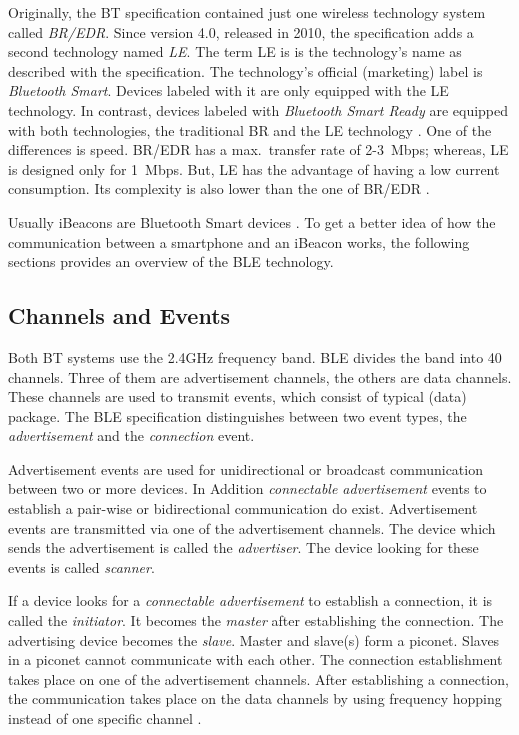 Originally, the \ac{BT} specification contained just one wireless technology system called \emph{\ac{BR}/\ac{EDR}}. Since version 4.0, released in 2010, the specification adds a second technology named \emph{\ac{LE}}. The term \ac{LE} is is the technology's name as described with the specification. The technology's official (marketing) label is \emph{Bluetooth Smart}. Devices labeled with it are only equipped with the \ac{LE} technology. In contrast, devices labeled with \emph{Bluetooth Smart Ready} are equipped with both technologies, the traditional \ac{BR} and the \ac{LE} technology \citep{bluetooth:spec}. One of the differences is speed. \ac{BR}/\ac{EDR} has a max.\ transfer rate of 2-3~Mbps; whereas, \ac{LE} is designed only for 1~Mbps. But, \ac{LE} has the advantage of having a low current consumption. Its complexity is also lower than the one of \ac{BR}/\ac{EDR} \citep{bluetooth:spec}.

Usually iBeacons are Bluetooth Smart devices \citep{binside:ds}. To get a better idea of how the communication between a smartphone and an iBeacon works, the following sections provides an overview of the \ac{BLE} technology.


\subsection*{Channels and Events}
Both \ac{BT} systems use the 2.4GHz frequency band. \ac{BLE} divides the band into 40 channels. Three of them are advertisement channels, the others are data channels. These channels are used to transmit events, which consist of typical (data) package. The \ac{BLE} specification distinguishes between two event types, the \emph{advertisement} and the \emph{connection} event.

Advertisement events are used for unidirectional or broadcast communication between two or more devices. In Addition \emph{connectable advertisement} events to establish a pair-wise or bidirectional communication do exist. Advertisement events are transmitted via one of the advertisement channels. The device which sends the advertisement is called the \emph{advertiser}. The device looking for these events is called \emph{scanner}.

If a device looks for a \emph{connectable advertisement} to establish a connection, it is called the \emph{initiator}. It becomes the \emph{master} after establishing the connection. The advertising device becomes the \emph{slave}. Master and slave(s) form a piconet. Slaves in a piconet cannot communicate with each other. The connection establishment takes place on one of the advertisement channels. After establishing a connection, the communication takes place on the data channels by using frequency hopping instead of one specific channel \citep{bluetooth:spec}.

